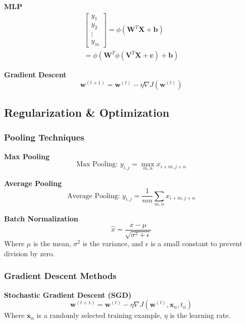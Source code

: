 \documentclass[8pt]{article}
\begin{document}
\begin{multicols}{2}
\textbf{MLP}
\begin{multline}
    \begin{bmatrix}
        y_1 \\
        y_2 \\
        \vdots \\
        y_m
    \end{bmatrix} = \phi(\mathbf{W}^T \mathbf{X} + \mathbf{b}) \\
    = \phi(\mathbf{W}^T \phi(\mathbf{V}^T \mathbf{X} + \mathbf{c}) + \mathbf{b})
\end{multline}

\textbf{Gradient Descent}
\begin{equation}
    \mathbf{w}^{(t+1)} = \mathbf{w}^{(t)} - \eta \nabla J(\mathbf{w}^{(t)})
\end{equation}

\subsection*{Regularization \& Optimization}

\subsubsection*{Pooling Techniques}

\textbf{Max Pooling}
\begin{equation}
    \text{Max Pooling: } y_{i,j} = \max_{m,n} x_{i+m, j+n}
\end{equation}

\textbf{Average Pooling}
\begin{equation}
    \text{Average Pooling: } y_{i,j} = \frac{1}{mn} \sum_{m,n} x_{i+m, j+n}
\end{equation}

\textbf{Batch Normalization}
\begin{equation}
    \hat{x} = \frac{x - \mu}{\sqrt{\sigma^2 + \epsilon}}
\end{equation}
Where $\mu$ is the mean, $\sigma^2$ is the variance, and $\epsilon$ is a small constant to prevent division by zero.

\subsubsection*{Gradient Descent Methods}

\textbf{Stochastic Gradient Descent (SGD)}
\begin{equation}
    \mathbf{w}^{(t+1)} = \mathbf{w}^{(t)} - \eta \nabla J(\mathbf{w}^{(t)}, \mathbf{x}_n, t_n)
\end{equation}
Where $\mathbf{x}_n$ is a randomly selected training example, $\eta$ is the learning rate.


\end{multicols}
\end{document}
